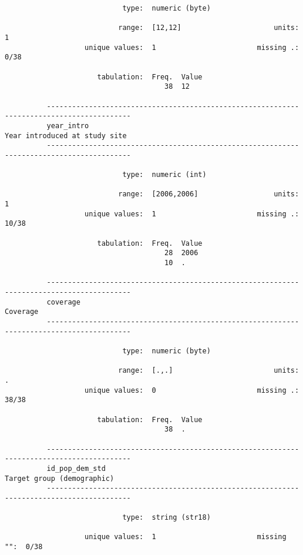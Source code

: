 \documentclass{article}
\begin{document}
\begin{verbatim}
                            type:  numeric (byte)
          
                           range:  [12,12]                      units:  1
                   unique values:  1                        missing .:  0/38
          
                      tabulation:  Freq.  Value
                                      38  12
          
          ------------------------------------------------------------------------------------------
          year_intro                                                   Year introduced at study site
          ------------------------------------------------------------------------------------------
          
                            type:  numeric (int)
          
                           range:  [2006,2006]                  units:  1
                   unique values:  1                        missing .:  10/38
          
                      tabulation:  Freq.  Value
                                      28  2006
                                      10  .
          
          ------------------------------------------------------------------------------------------
          coverage                                                                          Coverage
          ------------------------------------------------------------------------------------------
          
                            type:  numeric (byte)
          
                           range:  [.,.]                        units:  .
                   unique values:  0                        missing .:  38/38
          
                      tabulation:  Freq.  Value
                                      38  .
          
          ------------------------------------------------------------------------------------------
          id_pop_dem_std                                                  Target group (demographic)
          ------------------------------------------------------------------------------------------
          
                            type:  string (str18)
          
                   unique values:  1                        missing "":  0/38
          

\end{verbatim}
\end{document}
